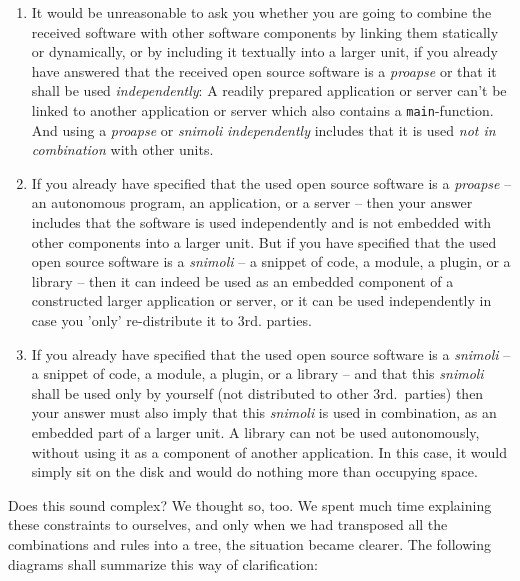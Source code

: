 \begin{enumerate}
  
  \item It would be unreasonable to ask you whether you are going to combine the
  received software with other software components by linking them statically or
  dynamically, or by including it textually into a larger unit, if you already
  have answered that the received open source software is a \emph{proapse} or
  that it shall be used \emph{independently}: A readily prepared application or
  server can't be linked to another application or server which also contains a
  \texttt{main}-function. And using a \emph{proapse} or \emph{snimoli}
  \emph{independently} includes that it is used \emph{not in combination} with
  other units.
  
  \item If you already have specified that the used open source software is a
  \emph{proapse} -- an autonomous program, an application, or a server -- then
  your answer includes that the software is used independently and is not
  embedded with other components into a larger unit. But if you have specified
  that the used open source software is a \emph{snimoli} -- a snippet of
  code, a module, a plugin, or a library -- then it can indeed be used as an
  embedded component of a constructed larger application or server, or it can be
  used independently in case you 'only' re-distribute it to 3rd. parties.
  
  \item If you already have specified that the used open source software is a
  \emph{snimoli} -- a snippet of code, a module, a plugin, or a library -- and
  that this \emph{snimoli} shall be used only by yourself (not distributed to
  other 3rd.\ parties) then your answer must also imply that this \emph{snimoli}
  is used in combination, as an embedded part of a larger unit. A library can
  not be used autonomously, without using it as a component of another
  application. In this case, it would simply sit on the disk and would do
  nothing more than occupying space.

\end{enumerate}

Does this sound complex? We thought so, too. We spent much time explaining these
constraints to ourselves, and only when we had transposed all the combinations
and rules into a tree, the situation became clearer. The following diagrams
shall summarize this way of clarification:

